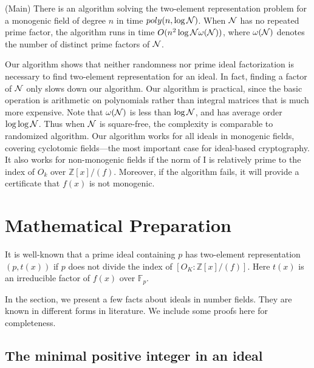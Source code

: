 \documentclass[runningheads, letter]{llncs}
\newcommand{\Z}{{\mathbb Z}}
\newcommand{\F}{{\mathbb F}}
\begin{document}
\begin{theorem}
  (Main) There is an algorithm solving the
  two-element representation problem for a monogenic field
  of degree \( n \) in time \( poly(n, \log {\cal N}) \).
  When \( {\cal N} \) has no repeated prime factor, 
  the algorithm runs in time \( O(n^2 \log {\cal N} \omega({\cal N})) \),
  where \( \omega ({\cal N}) \) denotes the number of distinct prime
  factors of \( {\cal N} \).
\end{theorem}

Our algorithm shows that neither randomness nor prime
ideal factorization is necessary to find
two-element representation for an ideal.
In fact, finding a factor of \( {\cal N} \) only slows
down our algorithm.
Our algorithm is practical, since the basic operation is
arithmetic on polynomials rather than integral matrices
that is much more expensive.  Note that \( \omega({\cal N}) \)
is less than \(  \log {\cal N} \), and has average order
\( \log\log {\cal N} \)\cite{HW08}.
Thus when \( {\cal N} \) is square-free,
the complexity is comparable to 
randomized algorithm. Our algorithm
  works for all ideals in monogenic fields, covering
  cyclotomic fields---the most important case
  for ideal-based cryptography.
It also works for non-monogenic fields if the norm of I is
relatively prime to the index of $O_k$
over $\Z[x]/(f)$. Moreover, if the algorithm fails,
it will provide a certificate that \( f(x) \)
is not monogenic.
%
%
%
%


\section{Mathematical Preparation}

It is well-known \cite{Cohen93} that
a prime ideal containing \( p \) has two-element
representation \( (p, t(x)) \) if
\( p \) does not divide the index of \( [O_K:\Z[x]/(f)] \).
 Here \( t(x) \) is an irreducible factor of \( f(x) \)
over \( \F_p \).

In the section, we present a few facts about ideals
in number fields. They are known in different forms in literature.
We include some proofs here for completeness.

\subsection{The minimal positive integer in an ideal}
\end{document}
